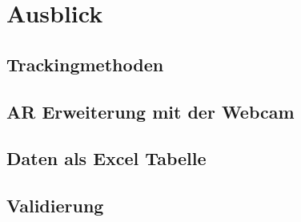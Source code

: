 \section{Ausblick}
\subsection{Trackingmethoden}
\subsection{AR Erweiterung mit der Webcam}
\subsection{Daten als Excel Tabelle}
\subsection{Validierung}
